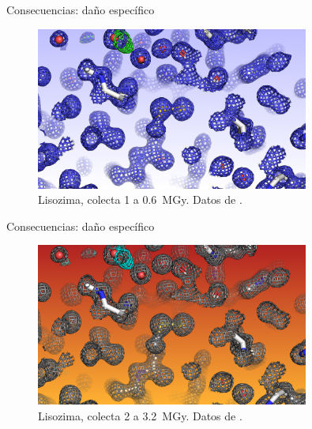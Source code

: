 \documentclass{beamer}
\begin{document}
\begin{frame}{Consecuencias: daño específico}
  \begin{figure}[h]
    \centering
    \includegraphics[width=0.8\textwidth]{before.png}
    \caption{Lisozima, colecta 1 a \SI{0.6}{\mega\gray}. Datos de \cite{Nanao2005}.}
  \end{figure}
\end{frame}
\begin{frame}{Consecuencias: daño específico}
  \begin{figure}[h]
    \centering
    \includegraphics[width=0.8\textwidth]{after.png}
    \caption{Lisozima, colecta 2 a \SI{3.2}{\mega\gray}. Datos de \cite{Nanao2005}.}
  \end{figure}
\end{frame}
\end{document}
